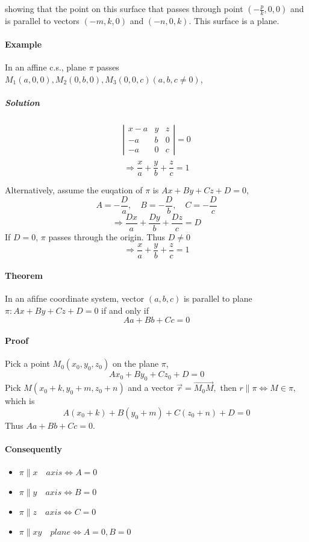 \documentclass[11pt]{book}
\begin{document}
showing that the point on this surface that passes through point $(-\frac{p}{k},0,0)$
and is parallel to vectors $(-m,k,0)$ and $(-n,0,k)$. This
surface is a plane.

\paragraph{Example} In an affine c.s., plane $\pi$ passes 
$M_1(a,0,0),M_2(0,b,0),M_3(0,0,c)(a,b,c\neq 0)$,
\subparagraph{Solution}
$$
\begin{array}{lll}
  \left|\begin{array}{ccc}
  x-a & y & z \\
  -a & b & 0 \\
  -a & 0 & c
  \end{array}\right|=0 \\
  \end{array}
$$
$$
\Rightarrow \frac{x}{a}+\frac{y}{b}+\frac{z}{c}=1
$$

Alternatively, assume the euqation of $\pi$ is $Ax+By+Cz+D=0$,
$$
A=-\frac{D}{a}, \quad B=-\frac{D}{b}, \quad C=-\frac{D}{c}
$$
$$
 \Rightarrow \frac{Dx}{a}+\frac{Dy}{b}+\frac{Dz}{c}=D
$$
If $D=0$, $\pi$ passes through the origin.
Thus $D\neq 0$
$$
 \Rightarrow \frac{x}{a}+\frac{y}{b}+\frac{z}{c}=1
$$

\paragraph{Theorem} In an afifne coordinate system, vector $(a,b,c)$
is parallel to plane \\$\pi : Ax+By+Cz+D=0$ if and only if
$$
Aa+Bb+Cc=0
$$
\paragraph{Proof} 
Pick a point $M_{0}\left(x_{0}, y_{0}, z_{0}\right)$ on
the plane $\pi$, 
$$
A x_{0}+B y_{0}+C z_{0}+D=0
$$
Pick 
$M\left(x_{0}+k, y_{0}+m, z_{0}+n\right)$ 
and a vector $\vec r=\overrightarrow{M_{0} M},$ 
then $r\parallel \pi \iff M \in \pi,$ which is 
$$
A\left(x_{0}+k\right)+B\left(y_{0}+m\right)+C\left(z_{0}+n\right)+D=0
$$
Thus $A a+B b+C c=0 .$

\paragraph{Consequently}
\begin{itemize}
  \item $\pi \parallel x \quad axis \iff A=0$
  \item $\pi \parallel y \quad axis \iff B=0$
  \item $\pi \parallel z \quad axis \iff C=0$
  \item $\pi \parallel xy \quad plane \iff A=0,B=0$
\end{itemize}
\end{document}
